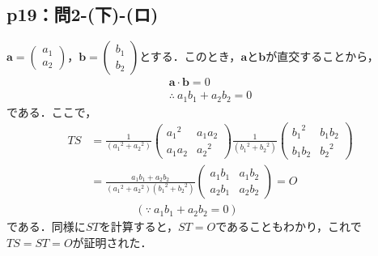 \subsection*{p19：問2-(下)-(ロ)}
\begin{tproof}
  $\bm{a}=
    \begin{pmatrix}
      a_1 \\
      a_2
    \end{pmatrix}
  $，$\bm{b}=
    \begin{pmatrix}
      b_1 \\
      b_2
    \end{pmatrix}
  $とする．このとき，$\bm{a}$と$\bm{b}$が直交することから，
  \begin{gather*}
    \bm{a} \cdot \bm{b}=0 \\
    \therefore ~a_1 b_1 + a_2 b_2 =0
  \end{gather*}
  である．ここで，
  \begin{align*}
    TS & = \frac{1}{({a_1}^2 +{a_2}^2)}
    \begin{pmatrix}
      {a_1}^2 & a_1 a_2 \\
      a_1 a_2 & {a_2}^2
    \end{pmatrix}
    \frac{1}{({b_1}^2 +{b_2}^2)}
    \begin{pmatrix}
      {b_1}^2 & b_1 b_2 \\
      b_1 b_2 & {b_2}^2
    \end{pmatrix}
    \\
       & =\frac{a_1 b_1 + a_2 b_2}{({a_1}^2 +{a_2}^2)({b_1}^2 +{b_2}^2)}
    \begin{pmatrix}
      a_1 b_1 & a_1 b_2 \\
      a_2 b_1 & a_2 b_2
    \end{pmatrix}
    =O                                                                   \\
       & \qquad \qquad  (\because ~ a_1 b_1 + a_2 b_2 =0)
  \end{align*}
  である．同様に$ST$を計算すると，$ST=O$であることもわかり，これで$TS=ST=O$が証明された．
\end{tproof}

